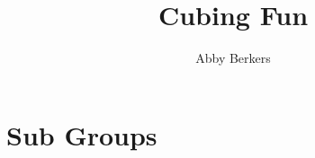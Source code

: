 \documentclass[oneside]{book}
\title{Cubing Fun}
\author{Abby Berkers}
\begin{document}
    \maketitle
    \clearpage

    \tableofcontents
    \clearpage

    

    

    \chapter{Sub Groups}
    

    \printbibliography
\end{document}
